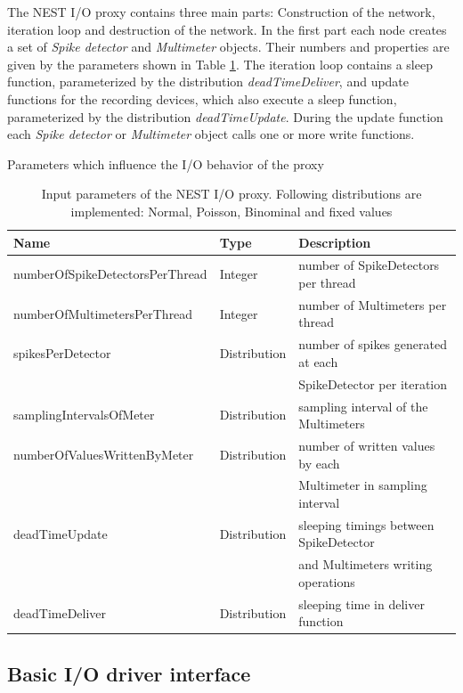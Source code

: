 \documentclass[]{YIC2015}
\begin{document}
The NEST I/O proxy contains three main parts: Construction of the
network, iteration loop and destruction of the network. In the first
part each node creates a set of \emph{Spike detector} and
\emph{Multimeter} objects. Their numbers and properties are given by
the parameters shown in Table \ref{tab:table-silva1}. The iteration
loop contains a sleep function, parameterized by the distribution
\emph{deadTimeDeliver}, and update functions for the recording
devices, which also execute a sleep function, parameterized by the
distribution \emph{deadTimeUpdate}. During the update function each
\emph{Spike detector} or \emph{Multimeter} object calls one or more
write functions.

\begin{table}[htdp]
\caption{Parameters which influence the I/O behavior of the proxy}
\centering
\begin{tabular}{lll}
\hline\hline
\textbf{Name}                   & \textbf{Type} & \textbf{Description} \\ \hline
numberOfSpikeDetectorsPerThread & Integer       & number of SpikeDetectors per thread  \\
numberOfMultimetersPerThread    & Integer       & number of Multimeters per thread  \\
spikesPerDetector               & Distribution  & number of spikes generated at each \\
				& 	        & SpikeDetector per iteration  \\
samplingIntervalsOfMeter        & Distribution  & sampling interval of the Multimeters  \\
numberOfValuesWrittenByMeter    & Distribution  & number of written values by each \\
				& 	        & Multimeter in sampling interval  \\
deadTimeUpdate                  & Distribution  & sleeping timings between SpikeDetector \\
				& 	        & and Multimeters writing operations \\
deadTimeDeliver                 & Distribution  & sleeping time in deliver function  \\
\hline\hline
\end{tabular}
\label{tab:table-silva1}
\caption{Input parameters of the NEST I/O proxy. Following distributions
  are implemented: Normal, Poisson, Binominal and fixed values}
\end{table}

\subsection{Basic I/O driver interface}
\end{document}
